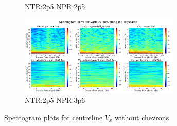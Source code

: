 \begin{figure}[H]
\begin{subfigure}{0.5\textwidth}
	\caption{NTR:2p5 NPR:2p5 }
	\label{fig:setup1}
\end{subfigure}%
\begin{subfigure}{0.5\textwidth}
	\centering
	\includegraphics[width=3in]{images/Spectogram_Vx_NTR2p5_NPR4p0.png}
	\caption{NTR:2p5 NPR:3p6 }
	\label{fig:setup2}
\end{subfigure}
\caption{Spectogram plots for centreline $V_x$ without chevrons }
\label{fig:spectogramVx}
\end{figure} 

